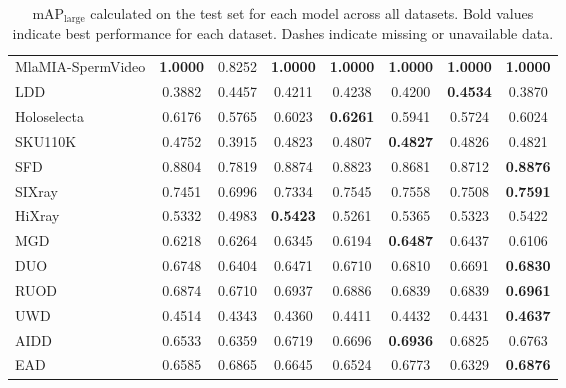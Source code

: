 \documentclass[runningheads]{llncs}
\begin{document}
\begin{table}[htbp]
\begin{tabular}{lccccccc}
MlaMIA-SpermVideo & \textbf{1.0000} & 0.8252 & \textbf{1.0000} & \textbf{1.0000} & \textbf{1.0000} & \textbf{1.0000} & \textbf{1.0000} \\
LDD & 0.3882 & 0.4457 & 0.4211 & 0.4238 & 0.4200 & \textbf{0.4534} & 0.3870 \\
\hline
Holoselecta & 0.6176 & 0.5765 & 0.6023 & \textbf{0.6261} & 0.5941 & 0.5724 & 0.6024 \\
SKU110K & 0.4752 & 0.3915 & 0.4823 & 0.4807 & \textbf{0.4827} & 0.4826 & 0.4821 \\
SFD & 0.8804 & 0.7819 & 0.8874 & 0.8823 & 0.8681 & 0.8712 & \textbf{0.8876} \\
\hline
SIXray & 0.7451 & 0.6996 & 0.7334 & 0.7545 & 0.7558 & 0.7508 & \textbf{0.7591} \\
HiXray & 0.5332 & 0.4983 & \textbf{0.5423} & 0.5261 & 0.5365 & 0.5323 & 0.5422 \\
MGD & 0.6218 & 0.6264 & 0.6345 & 0.6194 & \textbf{0.6487} & 0.6437 & 0.6106 \\
\hline
DUO & 0.6748 & 0.6404 & 0.6471 & 0.6710 & 0.6810 & 0.6691 & \textbf{0.6830} \\
RUOD & 0.6874 & 0.6710 & 0.6937 & 0.6886 & 0.6839 & 0.6839 & \textbf{0.6961} \\
UWD & 0.4514 & 0.4343 & 0.4360 & 0.4411 & 0.4432 & 0.4431 & \textbf{0.4637} \\
\hline
AIDD & 0.6533 & 0.6359 & 0.6719 & 0.6696 & \textbf{0.6936} & 0.6825 & 0.6763 \\
EAD & 0.6585 & 0.6865 & 0.6645 & 0.6524 & 0.6773 & 0.6329 & \textbf{0.6876} \\
\hline
\end{tabular}
\caption{mAP$_{\text{large}}$ calculated on the test set for each model across all datasets. Bold values indicate best performance for each dataset. Dashes indicate missing or unavailable data.}
\label{tab:yolo_maplarge_comparison}
\end{table}
\end{document}
